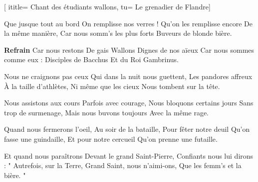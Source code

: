 [
ititle= {Chant des étudiants wallons},
tu= {Le grenadier de Flandre}]

\beginverse
Que jusque tout au bord
On remplisse nos verres !
Qu'on les remplisse encore
De la même manière,
Car nous somm's les plus forts
Buveurs de blonde bière.
\endverse

\beginchorus
\textbf {Refrain}
Car nous restons
De gais Wallons
Dignes de nos aïeux
Car nous sommes comme eux :
Disciples de Bacchus
Et du Roi Gambrinus.
\endchorus

\beginverse
Nous ne craignons pas ceux
Qui dans la nuit nous guettent,
Les pandores affreux
À la taille d'athlètes,
Ni même que les cieux
Nous tombent sur la tête.
\endverse

\beginverse
Nous assistons aux cours
Parfois avec courage,
Nous bloquons certains jours
Sans trop de surmenage,
Mais nous buvons toujours
Avec la même rage.
\endverse

\beginverse
Quand nous fermerons l'oeil,
Au soir de la bataille,
Pour fêter notre deuil
Qu'on fasse une guindaille,
Et pour notre cercueil
Qu'on prenne une futaille.
\endverse

\beginverse
Et quand nous paraîtrons
Devant le grand Saint-Pierre,
Confiants nous lui dirons :
" Autrefois, sur la Terre,
Grand Saint, nous n'aimi-ons,
Que les femm's et la bière. "
\endverse

\endsong
